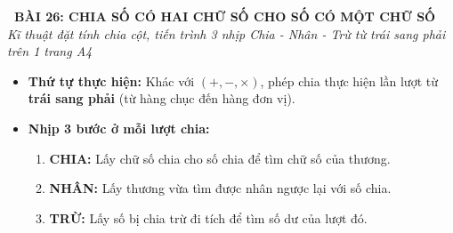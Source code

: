 \documentclass[12pt,a4paper]{article}
\begin{document}
\begin{tcolorbox}[
  enhanced,
  colback=teal!8!white,
  colframe=teal!70!black,
  arc=3mm, boxrule=1.2pt,
  left=3mm, right=3mm, top=2mm, bottom=2mm,
  halign=center
]
  {\LARGE\bfseries\color{teal!90!black}\faBookmark\ BÀI 26: CHIA SỐ CÓ HAI CHỮ SỐ CHO SỐ CÓ MỘT CHỮ SỐ}\\[1mm]
  {\itshape\footnotesize\color{black!75} Kĩ thuật đặt tính chia cột, tiến trình 3 nhịp Chia - Nhân - Trừ từ trái sang phải trên 1 trang A4}
\end{tcolorbox}

\vspace{-2mm}

\noindent
\begin{minipage}[t]{0.49\textwidth}\vspace{0pt}
\begin{tcolorbox}[
  enhanced,
  colback=blue!4!white,
  colframe=blue!75!black,
  arc=2mm, boxrule=0.8pt,
  left=2mm, right=2mm, top=1.8mm, bottom=1.8mm,
  title={\footnotesize\bfseries\color{white}\faShareAlt\ 1. Quy trình Đặt tính rồi tính}
]
{\footnotesize
\begin{itemize}\setlength{\itemsep}{1pt}\setlength{\leftskip}{-2.5mm}
  \item \textbf{Thứ tự thực hiện:} Khác với $(+, -, \times)$, phép chia thực hiện lần lượt từ \textbf{trái sang phải} (từ hàng chục đến hàng đơn vị).
  \item \textbf{Nhịp 3 bước ở mỗi lượt chia:}
  \begin{enumerate}\setlength{\itemsep}{0.5pt}\setlength{\leftskip}{-2.5mm}
    \item \textbf{CHIA:} Lấy chữ số chia cho số chia để tìm chữ số của thương.
    \item \textbf{NHÂN:} Lấy thương vừa tìm được nhân ngược lại với số chia.
    \item \textbf{TRỪ:} Lấy số bị chia trừ đi tích để tìm số dư của lượt đó.
  \end{enumerate}
\end{itemize}
}
\end{tcolorbox}
\end{minipage}
\hfill
\end{document}
